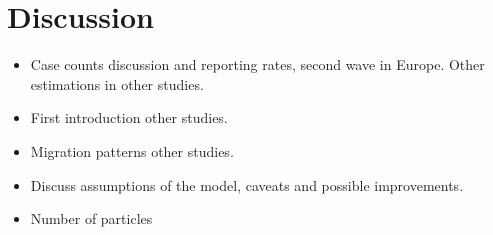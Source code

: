 \chapter{Discussion}

\begin{itemize}
\item Case counts discussion and reporting rates, second wave in Europe. Other estimations in other studies.



\item First introduction other studies. 

\item Migration patterns other studies.

\item Discuss assumptions of the model, caveats and possible improvements.

\item Number of particles
\end{itemize}